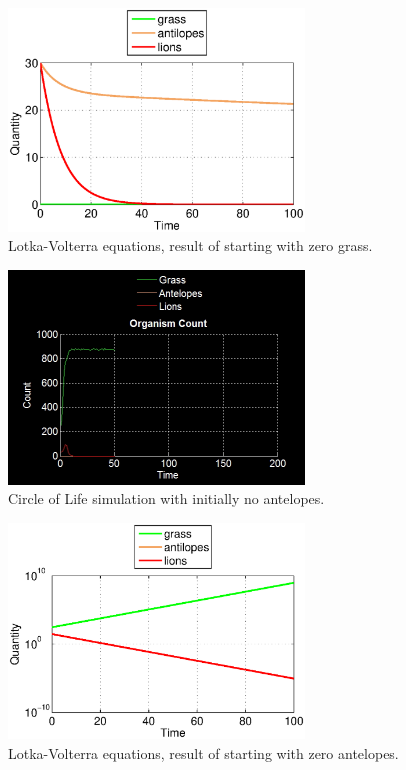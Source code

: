 \documentclass[11pt]{article}
\begin{document}
\begin{figure}[p]
\centering
\includegraphics[width=0.7\textwidth]{LotkaVolterraNoGrass.eps}
\caption{Lotka-Volterra equations, result of starting with zero grass.}
\label{fig:LotkaNoGrass}
\end{figure}

\begin{figure}
\centering
\includegraphics[width=0.7\textwidth]{noAntelopesOnlyCount.png}
\caption{Circle of Life simulation with initially no antelopes.}
\label{fig:noAntelopes}
\end{figure}

\begin{figure}
\centering
\includegraphics[width=0.7\textwidth]{LotkaVolterraNoAntelopes.eps}
\caption{Lotka-Volterra equations, result of starting with zero antelopes.}
\label{fig:LotkaNoAntelopes}
\end{figure}
\end{document}
